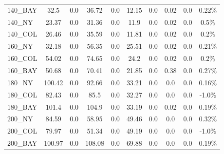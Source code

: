\documentclass[main.tex]{subfiles}
\begin{document}
\begin{center}
\begin{tabular}{lccccccccc}
140\_BAY & 32.5 & 0.0 & 36.72 & 0.0 & 12.15 & 0.0 & 0.02 & 0.0 & 0.22\%\\
140\_NY & 23.37 & 0.0 & 31.36 & 0.0 & 11.9 & 0.0 & 0.02 & 0.0 & 0.5\%\\
140\_COL & 26.46 & 0.0 & 35.59 & 0.0 & 11.81 & 0.0 & 0.02 & 0.0 & 0.2\%\\
160\_NY & 32.18 & 0.0 & 56.35 & 0.0 & 25.51 & 0.0 & 0.02 & 0.0 & 0.21\%\\
160\_COL & 54.02 & 0.0 & 74.65 & 0.0 & 24.2 & 0.0 & 0.02 & 0.0 & 0.2\%\\
160\_BAY & 50.68 & 0.0 & 70.41 & 0.0 & 21.85 & 0.0 & 0.38 & 0.0 & 0.27\%\\
180\_NY & 100.42 & 0.0 & 92.66 & 0.0 & 33.21 & 0.0 & 0.0 & 0.0 & 0.16\%\\
180\_COL & 82.43 & 0.0 & 85.5 & 0.0 & 32.27 & 0.0 & 0.0 & 0.0 & -1.0\%\\
180\_BAY & 101.4 & 0.0 & 104.9 & 0.0 & 33.19 & 0.0 & 0.02 & 0.0 & 0.19\%\\
200\_NY & 84.59 & 0.0 & 58.95 & 0.0 & 49.46 & 0.0 & 0.0 & 0.0 & 0.32\%\\
200\_COL & 79.97 & 0.0 & 51.34 & 0.0 & 49.19 & 0.0 & 0.0 & 0.0 & -1.0\%\\
200\_BAY & 100.97 & 0.0 & 108.08 & 0.0 & 69.88 & 0.0 & 0.0 & 0.0 & 0.19\%\\
\hline\end{tabular}
\end{center}
\newpage
\end{document}
